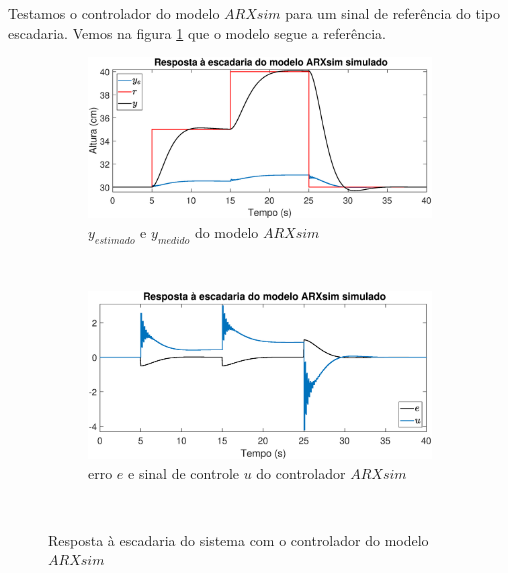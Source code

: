 Testamos o controlador do modelo $ARXsim$ para um sinal de referência do tipo escadaria. Vemos na figura \ref{fig:stairsarxsimy} que o modelo segue a referência.

\begin{figure}[htb]
	\centering
	\begin{subfigure}[t]{0.48\textwidth}
		\includegraphics[width=1\linewidth]{pasta1_figuras/stairsarxsimy}
		\caption[$y_{estimado}$ e $y_{medido}$ do modelo $ARX2$]{$y_{estimado}$ e $y_{medido}$ do modelo $ARXsim$}
		\label{fig:stairsarxsimy}
	\end{subfigure}
	~ %
	\begin{subfigure}[t]{0.48\textwidth}
		\includegraphics[width=1\linewidth]{pasta1_figuras/stairsarxsime}
		\caption[erro $e$ e sinal de controle $u$ do controlador $ARX2$]{erro $e$ e sinal de controle $u$ do controlador $ARXsim$}
		\label{fig:stairsarxsime}
	\end{subfigure}
	~ %
	
	\caption{Resposta à escadaria do sistema com o controlador do modelo $ARXsim$}\label{fig:stairsarxsim}
\end{figure}

